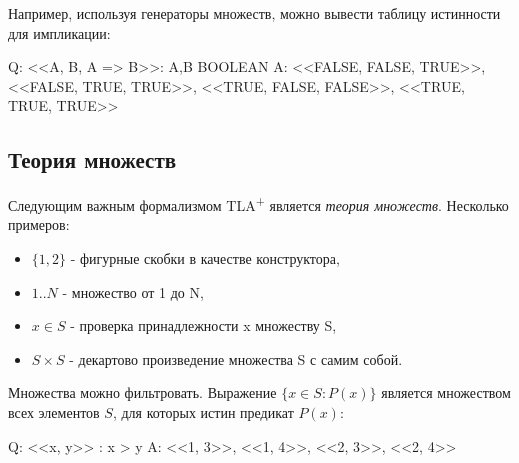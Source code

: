 \documentclass[14pt, openany]{report}
\newcommand{\tlapl}{TLA\textsuperscript{+} }
\begin{document}
\begin{tlatex}
%
%
\end{tlatex}

Например, используя генераторы множеств, можно вывести таблицу истинности для импликации:

\begin{tla}
  Q: {<<A, B, A => B>>: A,B \in BOOLEAN}
  A: {<<FALSE, FALSE, TRUE>>,
      <<FALSE, TRUE, TRUE>>,
      <<TRUE, FALSE, FALSE>>,
      <<TRUE, TRUE, TRUE>>}
\end{tla}
\begin{tlatex}
%
%
%
\end{tlatex}

\subsection{Теория множеств}
Следующим важным формализмом \tlapl является \emph{теория множеств}. Несколько примеров:
\begin{itemize}
  \item \(\{1, 2\}\) - фигурные скобки в качестве конструктора,
  \item \(1..N\) - множество от 1 до N,
  \item \(x \in S\) - проверка принадлежности x множеству S,
  \item \(S  \times S\) - декартово произведение множества S с самим собой.
\end{itemize}

Множества можно фильтровать. Выражение \(\{x \in S: P(x)\}\) является множеством всех элементов \(S\), для которых истин предикат \(P(x)\):

\begin{tla}
   Q: {<<x, y>>  : x > y}
   A: {<<1, 3>>, <<1, 4>>, <<2, 3>>, <<2, 4>>}
\end{tla}
\begin{tlatex}
\end{tlatex}
\end{document}
